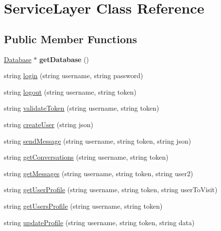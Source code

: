\hypertarget{classServiceLayer}{\section{Service\-Layer Class Reference}
\label{classServiceLayer}
}
\subsection*{Public Member Functions}
\begin{DoxyCompactItemize}
\item 
\hypertarget{classServiceLayer_a5c564934fe9abbc2d0106f84641d1636}{\hyperlink{classDatabase}{Database} $\ast$ {\bfseries get\-Database} ()}\label{classServiceLayer_a5c564934fe9abbc2d0106f84641d1636}

\item 
string \hyperlink{classServiceLayer_a156db9a26ee9c18b5dc004a53e6db135}{login} (string username, string password)
\item 
string \hyperlink{classServiceLayer_aa58f32a68f65731f5bff417a6d8587cd}{logout} (string username, string token)
\item 
string \hyperlink{classServiceLayer_a3158abab790bb26288e3d42529044c47}{validate\-Token} (string username, string token)
\item 
string \hyperlink{classServiceLayer_ae7b18cf7b281a5e97fe291202865bf24}{create\-User} (string json)
\item 
string \hyperlink{classServiceLayer_a8b160670006abd96a72634c021ff171f}{send\-Message} (string username, string token, string json)
\item 
string \hyperlink{classServiceLayer_a7b502342d937cb644ad8fa077cf4c563}{get\-Conversations} (string username, string token)
\item 
string \hyperlink{classServiceLayer_a3d5142f67a7d93a9b190c742772033d1}{get\-Messages} (string username, string token, string user2)
\item 
string \hyperlink{classServiceLayer_afe132fdef6f03f5f62caa525e4327100}{get\-User\-Profile} (string username, string token, string user\-To\-Visit)
\item 
string \hyperlink{classServiceLayer_aa734255db70314f738b097b6c048c994}{get\-Users\-Profile} (string username, string token)
\item 
string \hyperlink{classServiceLayer_a927f11b4f38d260b83b3c4de67801d81}{update\-Profile} (string username, string token, string data)
\end{DoxyCompactItemize}
